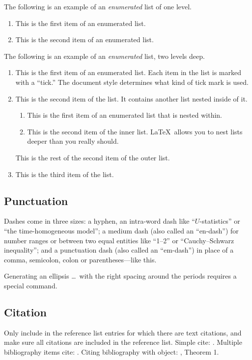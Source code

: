 \documentclass[aihp]{imsart}
\theoremstyle{plain}
\theoremstyle{definition}
\begin{document}
The following is an example of an \emph{enumerated} list of one level.

\begin{enumerate}
\item This is the first item of an enumerated list.
\item This is the second item of an enumerated list.
\end{enumerate}

The following is an example of an \emph{enumerated} list, two levels deep.
\begin{enumerate}
\item[1.]
This is the first item of an enumerated list.  Each item
in the list is marked with a ``tick.''  The document
style determines what kind of tick mark is used.
\item[2.]
This is the second item of the list.  It contains another
list nested inside of it.
\begin{enumerate}
\item
This is the first item of an enumerated list that
is nested within.
\item
This is the second item of the inner list.  \LaTeX\
allows you to nest lists deeper than you really should.
\end{enumerate}
This is the rest of the second item of the outer list.
\item[3.]
This is the third item of the list.
\end{enumerate}

\subsection{Punctuation}
Dashes come in three sizes: a hyphen, an intra-word dash like ``$U$-statistics'' or ``the time-homogeneous model'';
a medium dash (also called an ``en-dash'') for number ranges or between two equal entities like ``1--2'' or ``Cauchy--Schwarz inequality'';
and a punctuation dash (also called an ``em-dash'') in place of a comma, semicolon,
colon or parentheses---like this.

Generating an ellipsis \ldots\ with the right spacing
around the periods requires a special command.

\subsection{Citation}
Only include in the reference list entries for which there are text citations,
and make sure all citations are included in the reference list.
Simple cite: \cite{r1}.
Multiple bibliography items cite: \cite{r1,r2,r3,r4}.
Citing bibliography with object: \cite{r1}, Theorem 1.
\end{document}
